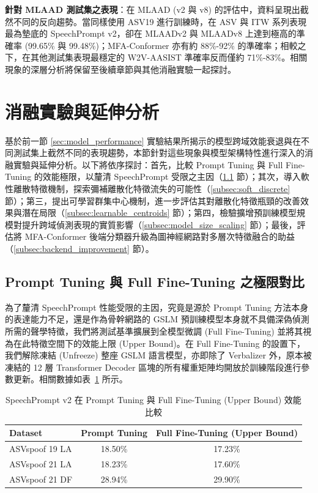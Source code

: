 \textbf{針對 MLAAD 測試集之表現}：在 MLAAD (v2 與 v8) 的評估中，資料呈現出截然不同的反向趨勢。當同樣使用 ASV19 進行訓練時，在 ASV 與 ITW 系列表現最為墊底的 SpeechPrompt v2，卻在 MLAADv2 與 MLAADv8 上達到極高的準確率 (99.65\% 與 99.48\%)；MFA-Conformer 亦有約 88\%-92\% 的準確率；相較之下，在其他測試集表現最穩定的 W2V-AASIST 準確率反而僅約 71\%-83\%。相關現象的深層分析將保留至後續章節與其他消融實驗一起探討。

\section{消融實驗與延伸分析}
\label{sec:discussion}

基於前一節 \ref{sec:model_performance} 實驗結果所揭示的模型跨域效能衰退與在不同測試集上截然不同的表現趨勢，本節針對這些現象與模型架構特性進行深入的消融實驗與延伸分析。以下將依序探討：首先，比較 Prompt Tuning 與 Full Fine-Tuning 的效能極限，以釐清 SpeechPrompt 受限之主因（\ref{subsec:pt_vs_fft} 節）；其次，導入軟性離散特徵機制，探索彌補離散化特徵流失的可能性（\ref{subsec:soft_discrete} 節）；第三，提出可學習群集中心機制，進一步評估其對離散化特徵瓶頸的改善效果與潛在局限（\ref{subsec:learnable_centroids} 節）；第四，檢驗擴增預訓練模型規模對提升跨域偵測表現的實質影響（\ref{subsec:model_size_scaling} 節）；最後，評估將 MFA-Conformer 後端分類器升級為圖神經網路對多層次特徵融合的助益（\ref{subsec:backend_improvement} 節）。

\subsection{Prompt Tuning 與 Full Fine-Tuning 之極限對比}
\label{subsec:pt_vs_fft}
為了釐清 SpeechPrompt 性能受限的主因，究竟是源於 Prompt Tuning 方法本身的表達能力不足，還是作為骨幹網路的 GSLM 預訓練模型本身就不具備深偽偵測所需的聲學特徵，我們將測試基準擴展到全模型微調 (Full Fine-Tuning) 並將其視為在此特徵空間下的效能上限 (Upper Bound)。在 Full Fine-Tuning 的設置下，我們解除凍結 (Unfreeze) 整座 GSLM 語言模型，亦即除了 Verbalizer 外，原本被凍結的 12 層 Transformer Decoder 區塊的所有權重矩陣均開放於訓練階段進行參數更新。相關數據如表~\ref{tab:exp1_speechprompt} 所示。

\begin{table}[H]
\centering
\caption{SpeechPrompt v2 在 Prompt Tuning 與 Full Fine-Tuning (Upper Bound) 效能比較}
\label{tab:exp1_speechprompt}
\begin{tabular}{lcc}
\toprule
\textbf{Dataset} & \textbf{Prompt Tuning} & \textbf{Full Fine-Tuning (Upper Bound)} \\
\midrule
ASVspoof 19 LA & 18.50\% & 17.23\% \\
ASVspoof 21 LA & 18.23\% & 17.60\% \\
ASVspoof 21 DF & 28.94\% & 29.90\% \\
\bottomrule
\end{tabular}
\end{table}

